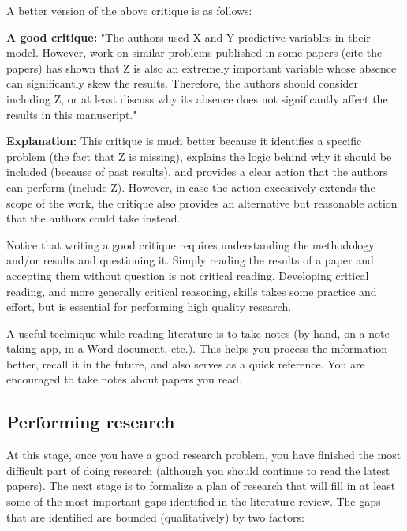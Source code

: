 \documentclass[12pt]{article}
\begin{document}
A better version of the above critique is as follows:

\textbf{A good critique:} "The authors used X and Y predictive variables in their model. However, work on similar problems published in some papers (cite the papers) has shown that Z is also an extremely important variable whose absence can significantly skew the results. Therefore, the authors should consider including Z, or at least discuss why its absence does not significantly affect the results in this manuscript."

\textbf{Explanation:} This critique is much better because it identifies a specific problem (the fact that Z is missing), explains the logic behind why it should be included (because of past results), and provides a clear action that the authors can perform (include Z). However, in case the action excessively extends the scope of the work, the critique also provides an alternative but reasonable action that the authors could take instead. 

Notice that writing a good critique requires understanding the methodology and/or results and questioning it. Simply reading the results of a paper and accepting them without question is not critical reading. Developing critical reading, and more generally critical reasoning, skills takes some practice and effort, but is essential for performing high quality research.

A useful technique while reading literature is to take notes (by hand, on a note-taking app, in a Word document, etc.). This helps you process the information better, recall it in the future, and also serves as a quick reference. You are encouraged to take notes about papers you read.

\subsection{Performing research}
At this stage, once you have a good research problem, you have finished the most difficult part of doing research (although you should continue to read the latest papers). The next stage is to formalize a plan of research that will fill in at least some of the most important gaps identified in the literature review. The gaps that are identified are bounded (qualitatively) by two factors:
\end{document}
